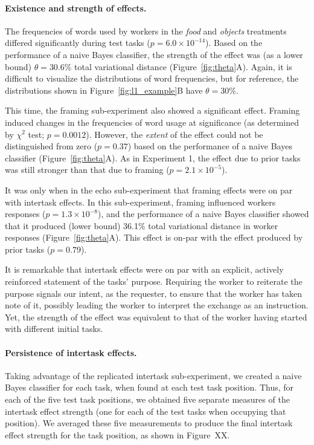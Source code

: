 \documentclass{sigchi}
\begin{document}
\paragraph{Existence and strength of effects.}
The frequencies of words used by
workers in the \textit{food} and \textit{objects} treatments differed
significantly during test tasks ($p = 6.0 \times 10^{-14}$).  Based on
the performance of a naive Bayes classifier, the strength of the effect 
was (as a lower bound) $\theta=30.6\%$ total variational distance
(Figure~\ref{fig:theta}A).  Again, it is difficult to visualize the 
distributions of word frequencies, but for reference, the distributions 
shown in Figure~\ref{fig:l1_example}B have $\theta = 30\%$.  

This time, the framing sub-experiment also showed a significant effect.
Framing induced changes in the frequencies of word usage at significance 
(as determined by $\chi^2$ test; $p=0.0012$).  However, 
the \textit{extent} of the effect could not be distinguished from zero
($p =0.37$) based on the performance of a naive Bayes classifier 
(Figure~\ref{fig:theta}A).
As in Experiment 1, the effect due to prior tasks was still stronger than 
that due to framing ($p=2.1\times 10^{-5}$).

It was only when in the echo sub-experiment 
that framing effects were on par with intertask effects.  
In this sub-experiment, framing influenced workers responses ($p=1.3\times10^{-8}$), and the performance of a naive Bayes classifier showed that 
it produced (lower bound) 36.1\% total variational distance in worker
responses (Figure~\ref{fig:theta}A).  This effect is on-par with the
effect produced by prior tasks ($p=0.79$).

It is remarkable that intertask effects were on par with an explicit, 
actively reinforced statement of the tasks' purpose.
Requiring the worker to reiterate the purpose signals our intent, as the 
requester, to ensure that the worker has taken note of it, 
possibly leading the worker to interpret the exchange as an instruction.  
Yet, the strength of the effect was equivalent to that of the worker having
started with different initial tasks.

\paragraph{Persistence of intertask effects.} 
Taking advantage of the replicated intertask sub-experiment, we created
a naive Bayes classifier for each task, when found at each test task 
position.  Thus, for each of the five test task positions, we obtained 
five separate measures of the intertask effect strength (one for each of 
the test tasks when occupying that position).  We averaged these five 
measurements to produce the final intertask effect strength for the task
position, as shown in Figure~XX.
\end{document}

